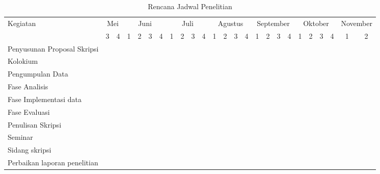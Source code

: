 \begin{table}[h!]
	\begin{center}
		\caption{Rencana Jadwal Penelitian}
		\label{tab:jadwal}
		\footnotesize
		\begin{tabular}{|l|c|c|c|c|c|c|c|c|c|c|c|c|c|c|c|c|c|c|c|c|c|c|c|c|}
			\hline
			\multirow{2}{*}{Kegiatan}&\multicolumn{2}{c|}{Mei}&\multicolumn{4}{c|}{Juni}&\multicolumn{4}{c|}{Juli}&\multicolumn{4}{c|}{Agustus}&\multicolumn{4}{c|}{September}&\multicolumn{4}{c|}{Oktober}&\multicolumn{2}{c|}{November}\\
			\cline{2-25}
			&3&4&1&2&3&4&1&2&3&4&1&2&3&4&1&2&3&4&1&2&3&4&1&2\\
			\hline
			Penyusunan Proposal Skripsi&\cellcolor{black}&\cellcolor{black}&\cellcolor{black}&\cellcolor{black}&\cellcolor{black}&&&&&&&&&&&&&&&&&&&\\
			\hline
			Kolokium&&&&&&\cellcolor{black}&&&&&&&&&&&&&&&&&&\\
			\hline
			Pengumpulan Data&\cellcolor{black}&\cellcolor{black}&\cellcolor{black}&\cellcolor{black}&\cellcolor{black}&\cellcolor{black}&&&&&&&&&&&&&&&&&&\\
			\hline
			Fase Analisis&&&&&&&\cellcolor{black}&\cellcolor{black}&&&&&&&&&&&&&&&&\\
			\hline
			Fase Implementasi data&&&&&&&&&\cellcolor{black}&\cellcolor{black}&\cellcolor{black}&\cellcolor{black}&\cellcolor{black}&\cellcolor{black}&\cellcolor{black}&\cellcolor{black}&&&&&&&&\\
			\hline
			Fase Evaluasi&&&&&&&&&&&&&&&&&\cellcolor{black}&\cellcolor{black}&&&&&&\\
			\hline
			Penulisan Skripsi&&&&&&&&&\cellcolor{black}&\cellcolor{black}&\cellcolor{black}&\cellcolor{black}&\cellcolor{black}&\cellcolor{black}&\cellcolor{black}&\cellcolor{black}&\cellcolor{black}&\cellcolor{black}&\cellcolor{black}&&&&&\\
			\hline
			Seminar&&&&&&&&&&&&&&&&&&&&\cellcolor{black}&&&&\\
			\hline
			Sidang skripsi&&&&&&&&&&&&&&&&&&&&&&\cellcolor{black}&&\\
			\hline
			Perbaikan laporan penelitian&&&&&&&&&&&&&&&&&&&&&&&\cellcolor{black}&\cellcolor{black}\\
			\hline
		\end{tabular}
		\normalsize
	\end{center}
\end{table}